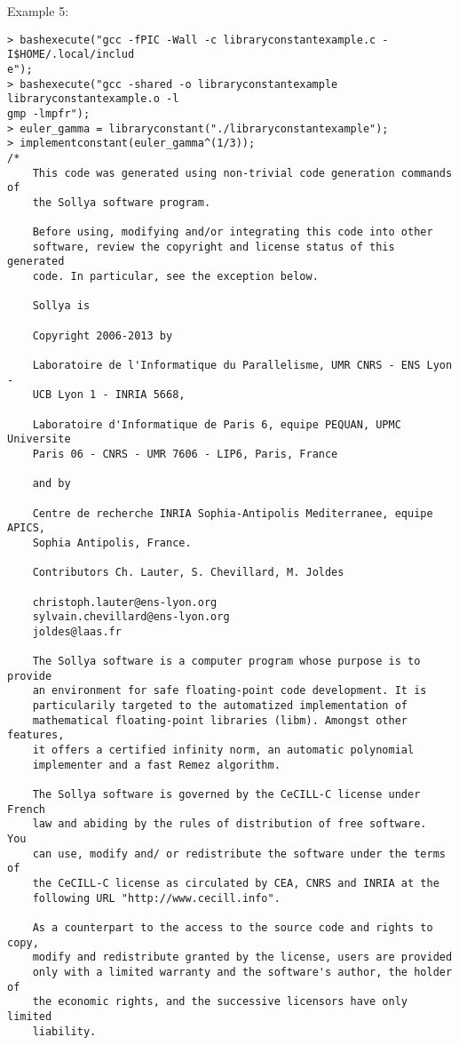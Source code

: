 \noindent Example 5: 
\begin{center}\begin{minipage}{15cm}\begin{Verbatim}[frame=single]
> bashexecute("gcc -fPIC -Wall -c libraryconstantexample.c -I$HOME/.local/includ
e");
> bashexecute("gcc -shared -o libraryconstantexample libraryconstantexample.o -l
gmp -lmpfr");
> euler_gamma = libraryconstant("./libraryconstantexample");
> implementconstant(euler_gamma^(1/3));
/*
    This code was generated using non-trivial code generation commands of
    the Sollya software program.
    
    Before using, modifying and/or integrating this code into other
    software, review the copyright and license status of this generated
    code. In particular, see the exception below.
    
    Sollya is
    
    Copyright 2006-2013 by
    
    Laboratoire de l'Informatique du Parallelisme, UMR CNRS - ENS Lyon -
    UCB Lyon 1 - INRIA 5668,
    
    Laboratoire d'Informatique de Paris 6, equipe PEQUAN, UPMC Universite
    Paris 06 - CNRS - UMR 7606 - LIP6, Paris, France
    
    and by
    
    Centre de recherche INRIA Sophia-Antipolis Mediterranee, equipe APICS,
    Sophia Antipolis, France.
    
    Contributors Ch. Lauter, S. Chevillard, M. Joldes
    
    christoph.lauter@ens-lyon.org
    sylvain.chevillard@ens-lyon.org
    joldes@laas.fr
    
    The Sollya software is a computer program whose purpose is to provide
    an environment for safe floating-point code development. It is
    particularily targeted to the automatized implementation of
    mathematical floating-point libraries (libm). Amongst other features,
    it offers a certified infinity norm, an automatic polynomial
    implementer and a fast Remez algorithm.
    
    The Sollya software is governed by the CeCILL-C license under French
    law and abiding by the rules of distribution of free software.  You
    can use, modify and/ or redistribute the software under the terms of
    the CeCILL-C license as circulated by CEA, CNRS and INRIA at the
    following URL "http://www.cecill.info".
    
    As a counterpart to the access to the source code and rights to copy,
    modify and redistribute granted by the license, users are provided
    only with a limited warranty and the software's author, the holder of
    the economic rights, and the successive licensors have only limited
    liability.
    

\end{Verbatim}
\end{minipage}
\end{center}
